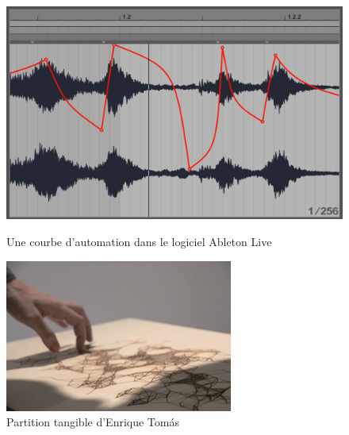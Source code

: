 \begin{figure}[!htbp]
	\captionsetup{format=plain}%
	\centering
	\begin{minipage}[t]{0.48\textwidth}
		\includegraphics[width=\linewidth]{gfx/03_gesture/AbletonLiveAutomation_72dpi.png}
		\caption{Une courbe d'automation dans le logiciel Ableton Live}
		\label{fig:gesture:automation}
	\end{minipage}
	\hspace{.02\linewidth}
	\begin{minipage}[t]{0.48\textwidth}
	  \includegraphics[width=\linewidth]{gfx/03_gesture/EnriqueThomas-TangibleScore_72dpi.jpg}
		\caption{Partition tangible d'Enrique Tomás}
		\label{fig:gesture:tangible_score}
	\end{minipage}
\end{figure}
